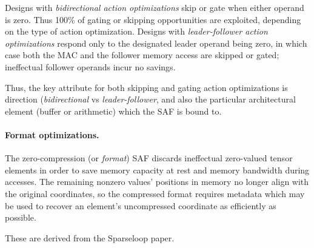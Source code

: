 Designs with \textit{bidirectional action optimizations} skip or gate when either operand is zero. Thus 100\% of gating or skipping opportunities are exploited, depending on the type of action optimization. Designs with \textit{leader-follower action optimizations} respond only to the designated leader operand being zero, in which case both the MAC and the follower memory access are skipped or gated; ineffectual follower operands incur no savings.

Thus, the key attribute for both skipping and gating action optimizations is direction (\textit{bidirectional} vs \textit{leader-follower}, and also the particular architectural element (buffer or arithmetic) which the SAF is bound to.

%
\paragraph{Format optimizations.} The zero-compression (or \textit{format}) SAF discards ineffectual zero-valued tensor elements in order to save memory capacity at rest and memory bandwidth during accesses\cite{sparseloop}. The remaining nonzero values' positions in memory no longer align with the original coordinates, so the compressed format requires metadata which may be used to recover an element's uncompressed coordinate as efficiently as possible.

These are derived from the Sparseloop\cite{sparseloop} paper.

%
%
%
%

%
%

